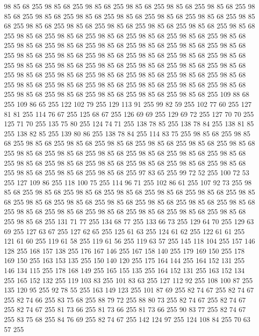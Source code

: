 98 85 68 255 98 85 68 255 98 85 68 255 98 85 68 255 98 85 68 255 98 85 68 255 98 85 68 255 98 85 68 255 98 85 68 255 98 85 68 255 98 85 68 255 98 85 68 255 98 85 68 255 98 85 68 255 98 85 68 255 98 85 68 255 98 85 68 255 98 85 68 255 98 85 68 255 98 85 68 255 98 85 68 255 98 85 68 255 98 85 68 255 98 85 68 255 98 85 68 255 98 85 68 255 98 85 68 255 98 85 68 255 98 85 68 255 98 85 68 255 98 85 68 255 98 85 68 255 98 85 68 255 98 85 68 255 98 85 68 255 98 85 68 255 98 85 68 255 98 85 68 255 98 85 68 255 98 85 68 255 98 85 68 255 98 85 68 255 98 85 68 255 98 85 68 255 98 85 68 255 98 85 68 255 98 85 68 255 98 85 68 255 98 85 68 255 98 85 68 255 98 85 68 255 98 85 68 255 98 85 68 255 98 85 68 255 98 85 68 255 98 85 68 255 98 85 68 255 98 85 68 255 98 85 68 255 98 85 68 255 109 88 68 255 109 86 65 255 122 102 79 255 129 113 91 255
99 82 59 255 102 77 60 255 127 81 81 255 114 76 67 255 125 68 67 255 126 69 69 255 129 69 72 255 127 70 70 255 125 71 70 255 135 75 80 255 124 74 71 255 138 78 85 255 138 78 84 255 138 81 85 255 138 82 85 255 139 80 86 255 138 78 84 255 114 83 75 255 98 85 68 255 98 85 68 255 98 85 68 255 98 85 68 255 98 85 68 255 98 85 68 255 98 85 68 255 98 85 68 255 98 85 68 255 98 85 68 255 98 85 68 255 98 85 68 255 98 85 68 255 98 85 68 255 98 85 68 255 98 85 68 255 98 85 68 255 98 85 68 255 98 85 68 255 98 85 68 255 98 85 68 255 98 85 68 255 98 85 68 255 97 83 65 255 99 72 52 255 100 72 53 255 127 109 86 255 118 100 75 255 114 96 71 255 102 86 61 255 107 92 73 255 98 85 68 255 98 85 68 255 98 85 68 255 98 85 68 255 98 85 68 255 98 85 68 255 98 85 68 255 98 85 68 255 98 85 68 255 98 85 68 255 98 85 68 255 98 85 68 255 98 85 68 255 98 85 68 255 98 85 68 255
98 85 68 255 98 85 68 255 98 85 68 255 98 85 68 255 98 85 68 255 131 71 77 255 134 68 77 255 133 66 73 255 129 64 70 255 129 63 69 255 127 63 67 255 127 62 65 255 125 61 63 255 124 61 62 255 122 61 61 255 121 61 60 255 119 61 58 255 119 61 56 255 119 63 57 255 145 118 104 255 157 146 128 255 168 157 138 255 176 167 146 255 167 158 140 255 179 169 150 255 178 169 150 255 163 153 135 255 150 140 120 255 175 164 144 255 164 152 131 255 146 134 115 255 178 168 149 255 165 155 135 255 164 152 131 255 163 152 134 255 165 152 132 255 119 103 83 255 101 83 63 255 127 112 92 255 108 100 87 255 135 120 95 255 92 78 55 255 163 149 123 255 101 87 69 255 82 74 67 255 82 74 67 255 82 74 66 255 83 75 68 255 88 79 72 255 88 80 73 255 82 74 67 255 82 74 67 255 82 74 67 255 81 73 66 255 81 73 66 255 81 73 66 255 90 83 77 255 82 74 67 255 83 75 68 255 84 76 69 255 82 74 67 255 142 124 97 255 124 108 84 255 70 63 57 255
